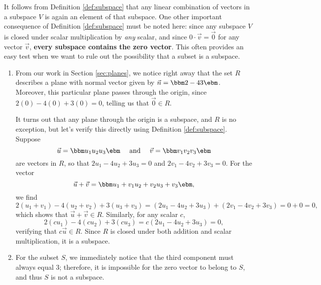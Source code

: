It follows from Definition \ref{def:subspace} that any linear combination of vectors in a subspace $V$ is again an element of that subspace. One other important consequence of Definition \ref{def:subspace} must be noted here: since any subspace $V$ is closed under scalar multiplication by \textit{any} scalar, and since $0\cdot\vec v = \vec 0$ for any vector $\vec v$, \textbf{every subspace contains the zero vector}. This often provides an easy test when we want to rule out the possibility that a subset is a subspace.

\medskip

{\begin{enumerate}
\item From our work in Section \ref{sec:planes}, we notice right away that the set $R$ describes a plane with normal vector given by $\vec n = \bbm 2\\-4\\3\ebm$. Moreover, this particular plane passes through the origin, since $2(0)-4(0)+3(0)=0$, telling us that $\vec 0 \in R$.

It turns out that any plane through the origin is a subspace, and $R$ is no exception, but let's verify this directly using Definition \ref{def:subspace}. Suppose 
\[
\vec u = \bbm u_1\\u_2\\u_3\ebm \quad \text{ and } \quad \vec v = \bbm v_1\\v_2\\v_3\ebm
\]
are vectors in $R$, so that $2u_1-4u_2+3u_3=0$ and $2v_1-4v_2+3v_3=0$. For the vector
\[
\vec u + \vec v = \bbm u_1+v_1\\u_2+v_2\\u_3+v_3\ebm,
\]
we find
\[
2(u_1+v_1)-4(u_2+v_2)+3(u_3+v_3) = (2u_1-4u_2+3u_3) + (2v_1-4v_2+3v_3) = 0 + 0 = 0,
\]
which shows that $\vec u+\vec v\in R$. Similarly, for any scalar $c$,
\[
2(cu_1)-4(cu_2)+3(cu_3) = c(2u_1-4u_2+3u_3) = 0,
\]
verifying that $c\vec u \in R$. Since $R$ is closed under both addition and scalar multiplication, it is a subspace.

\item For the subset $S$, we immediately notice that the third component must always equal 3; therefore, it is impossible for the zero vector to belong to $S$, and thus $S$ is not a subspace.
\end{enumerate}}

